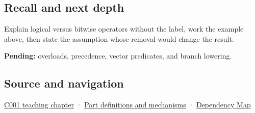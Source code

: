 \subsection{Recall and next depth}\label{appendix-fe6b457d68d8-recall-and-next-depth}

Explain logical versus bitwise operators without the label, work the example above, then state the assumption whose removal would change the result.

\textbf{Pending:} overloads, precedence, vector predicates, and branch lowering.

\subsection{Source and navigation}\label{appendix-fe6b457d68d8-source-and-navigation}

\hyperref[01-foundations-i-ch001-from-a-signal-to-an-interpretation]{C001 teaching chapter} · \hyperref[appendix-fd090d982a15]{Part definitions and mechanisms} · \hyperref[appendix-4ad47bdd269a]{Dependency Map}
